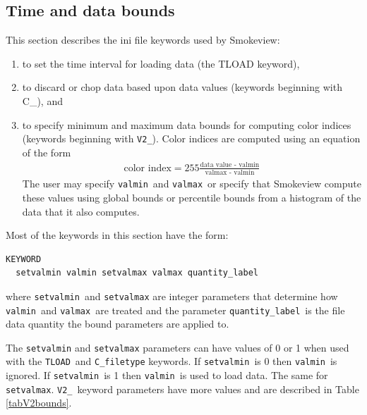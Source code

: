 \documentclass[11pt,twoside]{book}
\begin{document}
\subsection{Time and data bounds}

\label{section:timedatabounds}
This section describes the ini file keywords used by Smokeview:
\begin{enumerate}
\item to set the time interval for loading data (the TLOAD keyword),

\item to discard or chop data based upon data values (keywords beginning with C\_), and

\item to specify minimum and maximum data bounds
for computing color indices (keywords beginning with {\tt V2\_}).
Color indices are computed using an equation of the form
\begin{eqnarray*}
\mbox{color index} = 255\frac{\mbox{data~value - valmin}}{\mbox{valmax - valmin}}
\end{eqnarray*}
The user may specify {\tt valmin}\  and {\tt valmax}\  or specify
that Smokeview compute these values using global bounds
or percentile bounds from a histogram of the data that it also computes.

\end{enumerate}

\noindent Most of the keywords in this section have the form:
\begin{lstlisting}
KEYWORD
  setvalmin valmin setvalmax valmax quantity_label
\end{lstlisting}
\noindent where {\tt setvalmin}\ and {\tt setvalmax} are integer parameters
that determine how {\tt valmin}\ and {\tt valmax}\
are treated and the parameter {\tt quantity\_label}\ is the
file data quantity the bound parameters are applied to.

The {\tt setvalmin} and {\tt setvalmax} parameters can have values of  0 or 1 when used with
the {\tt TLOAD}\ and {\tt C\_filetype} keywords.
If {\tt setvalmin}\ is 0 then {\tt valmin}\ is ignored.
If {\tt setvalmin}\ is 1 then {\tt valmin}\ is used to load data.
The same for {\tt setvalmax}.
{\tt V2\_}\ keyword parameters have more values and are described in  Table \ref{tabV2bounds}.
\end{document}
